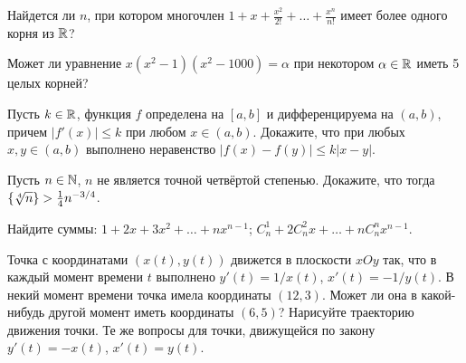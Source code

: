 \documentclass[a4paper, 12pt]{article}
\newcommand{\0}[1]{\overline{#1}}
\begin{document}






Найдется ли $n$, при котором многочлен
$1+x+\frac{x^2}{2!}+\dots+\frac{x^n}{n!}$ имеет %
более одного корня из $\mathbb{R}$?

 Может ли уравнение $x(x^2-1)(x^2-1000)=\alpha$ при некотором
$\alpha\in\mathbb{R}$ иметь 5 целых корней?


 Пусть $k\in\mathbb{R}$,
функция $f$ определена на $[a,b]$ и дифференцируема на $(a,b)$, причем $|f'(x)|\le k$
при любом $x\in(a,b)$. Докажите, что при любых $x,y\in (a,b)$ выполнено неравенство
$|f(x)-f(y)|\le k|x-y|$.

 Пусть $n\in\mathbb{N}$, $n$ не является точной четв\"ертой
степенью. Докажите, что тогда $\{\root{ 4} \of{ n}\}>\frac{1}{4}n^{-3/4}$.




Найдите суммы:
$1+2x+3x^2+\dots+nx^{n-1}$;
$C_n^1+2C_n^2x+\dots+nC_n^nx^{n-1}$.

Точка с координатами $(x(t),y(t))$ движется в %
плоскости $xOy$ так, что в каждый момент времени $t$ %
выполнено $y'(t)=1/x(t)$, $x'(t)=-1/y(t)$. %
В некий момент
времени точка имела координаты $(12,3)$. Может ли %
она в какой-нибудь другой момент %
иметь координаты $(6,5)$?
Нарисуйте траекторию движения точки.\qquad
{} Те же вопросы для точки, движущейся по закону
$y'(t)=-x(t)$, $x'(t)=y(t)$.

\end{document}
